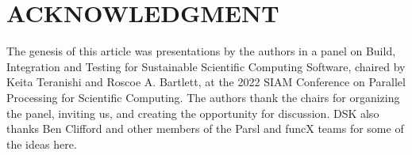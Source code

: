 \documentclass{IEEEcsmag}
\begin{document}
\section{ACKNOWLEDGMENT}

The genesis of this article was presentations by the authors in a panel on Build, Integration and Testing for
Sustainable Scientific Computing Software, chaired by Keita Teranishi and Roscoe A. Bartlett, at the 2022
SIAM Conference on Parallel Processing for Scientific Computing. The authors thank the chairs for organizing
the panel, inviting us, and creating the opportunity for discussion. DSK also thanks Ben Clifford and other
members of the Parsl and funcX teams for some of the ideas here.



\end{document}
